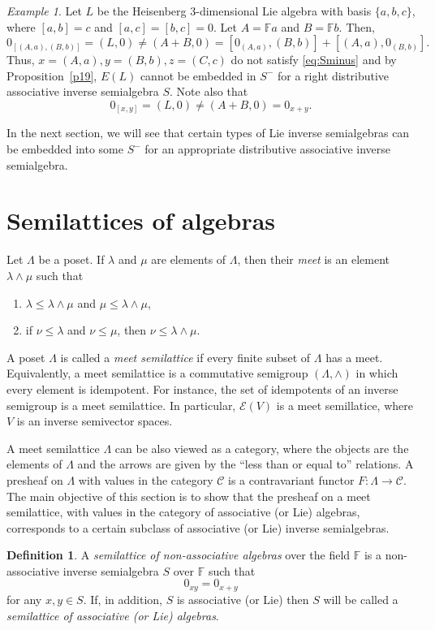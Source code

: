 \documentclass[10pt,a4paper]{amsart}
\theoremstyle{definition}
\newtheorem{defn}[thm]{Definition}
\theoremstyle{remark}
\newtheorem{ex}[thm]{Example}
\numberwithin{equation}{section}
\newtheorem*{Theorem A}{\textbf{Theorem A}}
\newtheorem*{Corollary E}{\textbf{Corollary E}}
\newtheorem*{Corollary F}{\textbf{Corollary F}}
\newtheorem*{Theorem B}{\textbf{Theorem B}}
\newtheorem*{Theorem C}{\textbf{Theorem C}}
\newtheorem*{Theorem D}{\textbf{Theorem B}}
\newtheorem*{p a}{\textbf{Proof of  Theorem A}}
\newtheorem*{p b}{\textbf{Proof of Theorem B}}
\newtheorem*{p c}{\textbf{Proof of  Theorem C}}
\newtheorem*{p d}{\textbf{Proof of  Theorem D}}
\newcommand{\E}{\mathcal{E}}
\newcommand{\F}{\mathbb{F}}
\newcommand{\0}{{\vartheta}}
\begin{document}
\begin{ex}\label{exHeisenberg}
Let $L$ be the Heisenberg 3-dimensional Lie algebra with basis  $\{a,b,c\}$,  where $[a,b]=c$ and $[a,c]=[b,c]=0$. Let $A= \F a$ and $B= \F b$. Then, 
$$0_{[(A,a),(B,b)]}=(L,0)\neq (A+B,0) =  [0_{(A,a)},(B,b)]+[(A,a),0_{(B,b)}].$$ 
Thus, $x=(A,a), y= (B,b), z= (C,c)$  do not satisfy \eqref{eq:Sminus} and by Proposition~\ref{p19}, $E(L)$ cannot be embedded in $S^-$ for a right distributive associative inverse semialgebra $S$.  Note also that 
$$0_{[x,y]} = (L,0)\neq (A+B,0) =  0_{x+y}. $$ 
\end{ex}

In the next section, we will see that certain types of Lie inverse semialgebras can be embedded into some $S^-$
for an appropriate distributive associative inverse semialgebra.


\section{Semilattices of algebras}\label{s: semillatices}
Let $\Lambda$  be a poset. If $\lambda$ and $\mu$ are elements of $\Lambda$, then their  {\em meet} is an element $\lambda\wedge \mu$ such that
\begin{enumerate}
    \item $\lambda\leq \lambda\wedge\mu$ and $\mu\leq \lambda\wedge\mu$, 
    \item if $\nu\leq \lambda$ and $\nu\leq \mu$, then $\nu\leq \lambda\wedge\mu.$
\end{enumerate}
A poset $\Lambda$ is called a {\em meet semilattice} if every finite subset of $\Lambda$ has a meet. Equivalently, a meet semilattice is a commutative semigroup $(\Lambda,\wedge)$ in which every element is idempotent.  For instance, the set of idempotents of an inverse semigroup  is a meet semilattice.  In particular, $\E (V)$ is a meet semillatice, where $V$ is an inverse semivector spaces.

A meet semilattice $\Lambda$ can be also viewed as a category, where the objects are the elements of $\Lambda$ and the arrows are given by the ``less than or equal to'' relations.  A presheaf on $\Lambda$ with values in the category $\mathcal{C}$ is a contravariant functor $F: \Lambda\to \mathcal{C}$.
The main objective of this section is to show that the presheaf on a meet semilattice, with values in the category of associative (or Lie) algebras, corresponds to a certain subclass of associative (or Lie) inverse semialgebras.


\begin{defn}\label{def:SemilatNonAssocAlg} A {\em semilattice of non-associative algebras} over  the field $\F$ is a  non-associative inverse semialgebra $S$ over $\F$ such that 
\begin{equation}\label{eq:semilatticeAlg}
    0_{xy}=0_{x+y}
\end{equation} for any  $x,y \in S.$ If, in addition, $S$ is  associative (or Lie) then  $S$ will be called a {\em semilattice of associative (or Lie) algebras}.
\end{defn}
\end{document}
